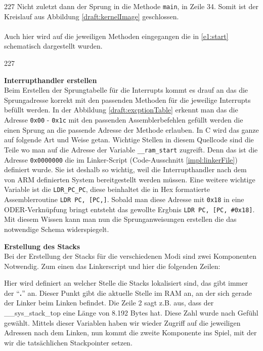 \begin{dinglist}{227}
Nicht zuletzt dann der Sprung in die Methode \texttt{main}, in Zeile 34. Somit ist der Kreislauf aus Abbildung \ref{draft:kernelImage} geschlossen.\\ \\
Auch hier wird auf die jeweiligen Methoden eingegangen die in 
\ref{e1:start} schematisch dargestellt wurden.
\begin{dinglist}{227}
	\item{\textbf{Interrupthandler erstellen}}\\
	Beim Erstellen der Sprungtabelle f\"ur die Interrupts kommt es drauf an das die Sprungadresse korrekt mit den passenden Methoden f\"ur die jeweilige Interrupts bef\"ullt werden. In der Abbildung \ref{draft:excptionTable} erkennt man das die Adresse \texttt{0x00} - \texttt{0x1c} mit den passenden Assemblerbefehlen gef\"ullt werden die einen Sprung an die passende Adresse der Methode erlauben. In C wird das ganze auf folgende Art und Weise getan.	
Wichtige Stellen in diesem Quellcode sind die Teile wo man auf die Adresse der Variable \texttt{\_\_ram\_start} zugreift. Denn das ist die Adresse \texttt{0x0000000} die im Linker-Script (Code-Ausschnitt \ref{impl:linkerFile}) definiert wurde. Sie ist deshalb so wichtig, weil die Interrupthandler nach dem von ARM definierten System bereitgestellt werden m\"ussen. Eine weitere wichtige Variable ist die \texttt{LDR\_PC\_PC}, diese beinhaltet die in Hex formatierte Assemblerroutine \texttt{LDR PC, [PC,]}. Sobald man diese Adresse mit \texttt{0x18} in eine ODER-Verkn\"upfung bringt entsteht das gewollte Ergbnis \texttt{LDR PC, [PC, \#0x18]}.
Mit diesem Wissen kann man nun die Sprunganweisungen erstellen die das notwendige Schema widerspiegelt.

	\item{\textbf{Erstellung des Stacks}}\\
	Bei der Erstellung der Stacks f\"ur die verschiedenen Modi sind zwei Komponenten Notwendig. Zum einen das Linkerscript und hier die folgenden Zeilen:
	
	Hier wird definiert an welcher Stelle die Stacks lokalisiert sind, das gibt immer der ``\textbf{.}'' an. Dieser Punkt gibt die aktuelle Stelle im RAM an, an der sich gerade der Linker beim Linken befindet. Die Zeile 2 sagt z.B. aus, dass der \_\_sys\_stack\_top eine L\"ange von 8.192 Bytes hat. Diese Zahl wurde nach Gef\"uhl gew\"ahlt. Mittels dieser Variablen haben wir wieder Zugriff auf die jeweiligen Adressen nach dem Linken, nun kommt die zweite Komponente ins Spiel, mit der wir die tats\"achlichen Stackpointer setzen.	

\end{dinglist}
\end{dinglist}
